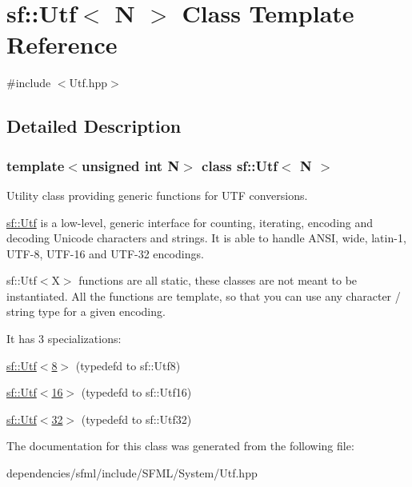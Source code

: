 \hypertarget{classsf_1_1_utf}{}\section{sf\+:\+:Utf$<$ N $>$ Class Template Reference}
\label{classsf_1_1_utf}


{\ttfamily \#include $<$Utf.\+hpp$>$}



\subsection{Detailed Description}
\subsubsection*{template$<$unsigned int N$>$\newline
class sf\+::\+Utf$<$ N $>$}

Utility class providing generic functions for U\+TF conversions.

\hyperlink{classsf_1_1_utf}{sf\+::\+Utf} is a low-\/level, generic interface for counting, iterating, encoding and decoding Unicode characters and strings. It is able to handle A\+N\+SI, wide, latin-\/1, U\+T\+F-\/8, U\+T\+F-\/16 and U\+T\+F-\/32 encodings.

sf\+::\+Utf$<$\+X$>$ functions are all static, these classes are not meant to be instantiated. All the functions are template, so that you can use any character / string type for a given encoding.

It has 3 specializations\+: \begin{DoxyItemize}
\item \hyperlink{classsf_1_1_utf_3_018_01_4}{sf\+::\+Utf$<$8$>$} (typedef\textquotesingle{}d to sf\+::\+Utf8) \item \hyperlink{classsf_1_1_utf_3_0116_01_4}{sf\+::\+Utf$<$16$>$} (typedef\textquotesingle{}d to sf\+::\+Utf16) \item \hyperlink{classsf_1_1_utf_3_0132_01_4}{sf\+::\+Utf$<$32$>$} (typedef\textquotesingle{}d to sf\+::\+Utf32) \end{DoxyItemize}


The documentation for this class was generated from the following file\+:\begin{DoxyCompactItemize}
\item 
dependencies/sfml/include/\+S\+F\+M\+L/\+System/Utf.\+hpp\end{DoxyCompactItemize}

